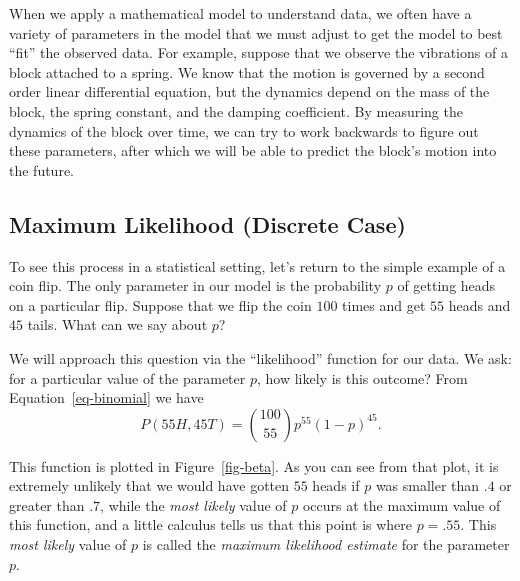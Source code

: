 \documentclass[
  11pt,
  letterpaper,
]{scrbook}
\theoremstyle{plain}
\theoremstyle{plain}
\theoremstyle{remark}
\begin{document}
When we apply a mathematical model to understand data, we often have a
variety of parameters in the model that we must adjust to get the model
to best ``fit'' the observed data. For example, suppose that we observe
the vibrations of a block attached to a spring. We know that the motion
is governed by a second order linear differential equation, but the
dynamics depend on the mass of the block, the spring constant, and the
damping coefficient. By measuring the dynamics of the block over time,
we can try to work backwards to figure out these parameters, after which
we will be able to predict the block's motion into the future.

\hypertarget{sec-mlcoin}{%
\subsection{Maximum Likelihood (Discrete Case)}\label{sec-mlcoin}}

To see this process in a statistical setting, let's return to the simple
example of a coin flip. The only parameter in our model is the
probability \(p\) of getting heads on a particular flip. Suppose that we
flip the coin \(100\) times and get \(55\) heads and \(45\) tails. What
can we say about \(p\)?

We will approach this question via the ``likelihood'' function for our
data. We ask: for a particular value of the parameter \(p\), how likely
is this outcome? From Equation~\ref{eq-binomial} we have \[
P(55H,45T)=\binom{100}{55}p^{55}(1-p)^{45}.
\]

This function is plotted in Figure~\ref{fig-beta}. As you can see from
that plot, it is extremely unlikely that we would have gotten \(55\)
heads if \(p\) was smaller than \(.4\) or greater than \(.7\), while the
\emph{most likely} value of \(p\) occurs at the maximum value of this
function, and a little calculus tells us that this point is where
\(p=.55\). This \emph{most likely} value of \(p\) is called the
\emph{maximum likelihood estimate} for the parameter \(p\).
\end{document}
